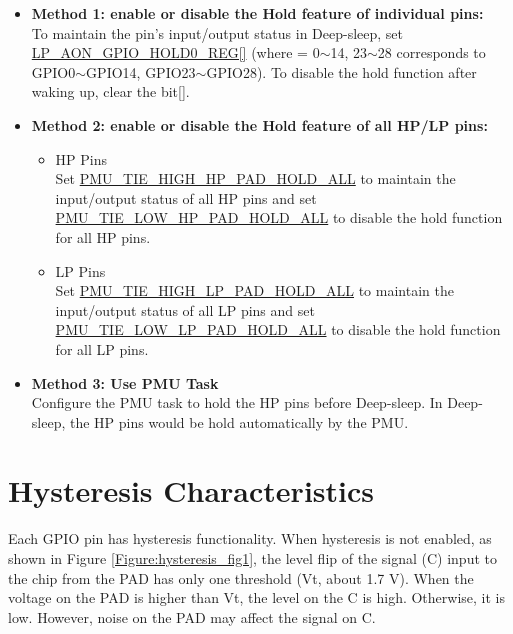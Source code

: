 \documentclass[main\_\_EN.tex]{subfiles}
\begin{document}
\begin{itemize}
    \item \textbf{Method 1: enable or disable the Hold feature of individual pins:}\\
    To maintain the pin's input/output status in Deep-sleep, set \hyperref[regdesc:LPAONGPIOHOLD0REG]{LP\_AON\_GPIO\_HOLD0\_REG[]} (where  = 0$\sim$14, 23$\sim$28 corresponds to GPIO0$\sim$GPIO14, GPIO23$\sim$GPIO28). To disable the hold function after waking up, clear the bit[].
    \item \textbf{Method 2: enable or disable the Hold feature of all HP/LP pins:}\\
    \begin{itemize}
        \item HP Pins\\
        Set \hyperref[fielddesc:PMUTIEHIGHHPPADHOLDALL]{PMU\_TIE\_HIGH\_HP\_PAD\_HOLD\_ALL} to maintain the input/output status of all HP pins and set \hyperref[fielddesc:PMUTIELOWHPPADHOLDALL]{PMU\_TIE\_LOW\_HP\_PAD\_HOLD\_ALL} to disable the hold function for all HP pins.
        \item LP Pins\\
        Set \hyperref[fielddesc:PMUTIEHIGHLPPADHOLDALL]{PMU\_TIE\_HIGH\_LP\_PAD\_HOLD\_ALL} to maintain the input/output status of all LP pins and set \hyperref[fielddesc:PMUTIELOWLPPADHOLDALL]{PMU\_TIE\_LOW\_LP\_PAD\_HOLD\_ALL} to disable the hold function for all LP pins.
    \end{itemize}
    \item \textbf{Method 3: Use PMU Task}\\
    Configure the PMU task to hold the HP pins before Deep-sleep. In Deep-sleep, the HP pins would be hold automatically by the PMU.
\end{itemize}


\section{Hysteresis Characteristics}\label{PadHysEn}

Each GPIO pin has hysteresis functionality. When hysteresis is not enabled, as shown in Figure \ref{Figure:hysteresis_fig1}, the level flip of the signal (C) input to the chip from the PAD has only one threshold (Vt, about 1.7 V). When the voltage on the PAD is higher than Vt, the level on the C is high. Otherwise, it is low. However, noise on the PAD may affect the signal on C.
\end{document}
